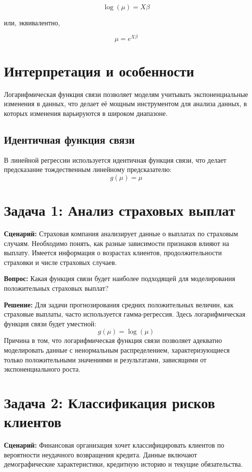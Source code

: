 \begin{itemize}
\[
\log(\mu) = X\beta
\]

или, эквивалентно,

\[
\mu = e^{X\beta}
\]

\section*{Интерпретация и особенности}

Логарифмическая функция связи позволяет моделям учитывать экспоненциальные изменения в данных, что делает её мощным инструментом для анализа данных, в которых изменения варьируются в широком диапазоне.

\subsection*{Идентичная функция связи}

В линейной регрессии используется идентичная функция связи, что делает предсказание тождественным линейному предсказателю:
\[
g(\mu) = \mu
\]
\section*{Задача 1: Анализ страховых выплат}

\textbf{Сценарий:} 
Страховая компания анализирует данные о выплатах по страховым случаям. Необходимо понять, как разные зависимости признаков влияют на выплату. Имеется информация о возрастах клиентов, продолжительности страховки и числе страховых случаев.

\textbf{Вопрос:} 
Какая функция связи будет наиболее подходящей для моделирования положительных страховых выплат?

\textbf{Решение:} 
Для задачи прогнозирования средних положительных величин, как страховые выплаты, часто используется гамма-регрессия. Здесь логарифмическая функция связи будет уместной:
\[
g(\mu) = \log(\mu)
\]
Причина в том, что логарифмическая функция связи позволяет адекватно моделировать данные с ненормальным распределением, характеризующиеся только положительными значениями и результатами, зависящими от экспоненциального роста.

\section*{Задача 2: Классификация рисков клиентов}

\textbf{Сценарий:} 
Финансовая организация хочет классифицировать клиентов по вероятности неудачного возвращения кредита. Данные включают демографические характеристики, кредитную историю и текущие обязательства.


\end{itemize}
